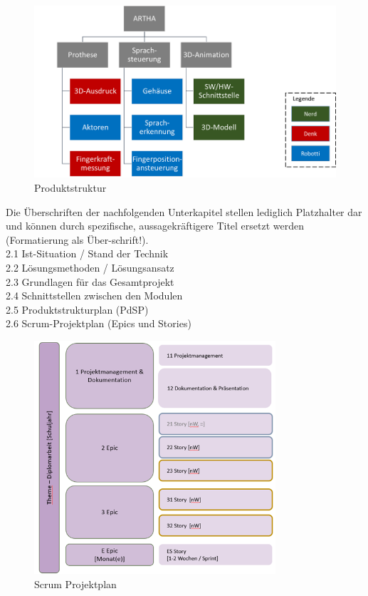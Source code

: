 \documentclass{article}
\begin{document}
\begin{figure}[h]
    \includegraphics[width=1\textwidth]{Produktstruktur.png}
    \centering
    \caption{Produktstruktur}
    \label{Produktstruktur}
\end{figure}

Die Überschriften der nachfolgenden Unterkapitel stellen lediglich Platzhalter dar und können durch spezifische, aussagekräftigere Titel ersetzt werden (Formatierung als Über-schrift!).\\
2.1 Ist-Situation / Stand der Technik\\
2.2 Lösungsmethoden / Lösungsansatz\\
2.3 Grundlagen für das Gesamtprojekt\\
2.4 Schnittstellen zwischen den Modulen\\
2.5 Produktstrukturplan (PdSP)\\
2.6 Scrum-Projektplan (Epics und Stories)

\begin{figure}[h]
    \includegraphics[width=0.8\textwidth]{Scrum_Projektplan.png}
    \centering
    \caption{Scrum Projektplan}
\end{figure}
\end{document}
